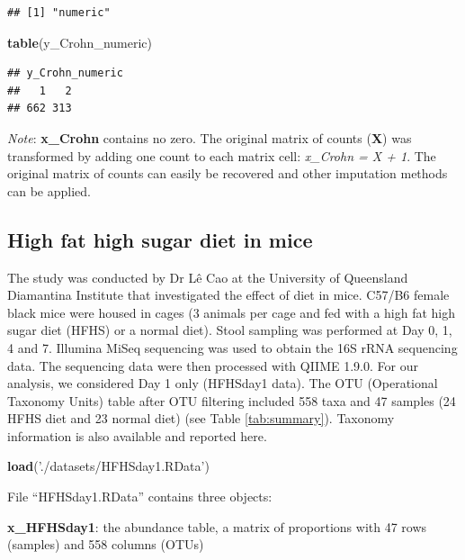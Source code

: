 \documentclass[openany]{book}
\newenvironment{Shaded}{\begin{snugshade}}{\end{snugshade}}
\newcommand{\KeywordTok}[1]{\textcolor[rgb]{0.13,0.29,0.53}{\textbf{#1}}}
\newcommand{\StringTok}[1]{\textcolor[rgb]{0.31,0.60,0.02}{#1}}
\newcommand{\NormalTok}[1]{#1}
\begin{document}
\begin{verbatim}
## [1] "numeric"
\end{verbatim}

\begin{Shaded}
\begin{Highlighting}[]
\KeywordTok{table}\NormalTok{(y_Crohn_numeric)}
\end{Highlighting}
\end{Shaded}

\begin{verbatim}
## y_Crohn_numeric
##   1   2 
## 662 313
\end{verbatim}

\emph{Note}: \textbf{x\_Crohn} contains no zero. The original matrix of
counts (\textbf{X}) was transformed by adding one count to each matrix
cell: \emph{x\_Crohn = X + 1}. The original matrix of counts can easily
be recovered and other imputation methods can be applied.

\subsection{High fat high sugar diet in
mice}\label{high-fat-high-sugar-diet-in-mice}

The study was conducted by Dr Lê Cao at the University of Queensland
Diamantina Institute that investigated the effect of diet in mice.
C57/B6 female black mice were housed in cages (3 animals per cage and
fed with a high fat high sugar diet (HFHS) or a normal diet). Stool
sampling was performed at Day 0, 1, 4 and 7. Illumina MiSeq sequencing
was used to obtain the 16S rRNA sequencing data. The sequencing data
were then processed with QIIME 1.9.0. For our analysis, we considered
Day 1 only (HFHSday1 data). The OTU (Operational Taxonomy Units) table
after OTU filtering included 558 taxa and 47 samples (24 HFHS diet and
23 normal diet) (see Table \ref{tab:summary}). Taxonomy information is
also available and reported here.

\begin{Shaded}
\begin{Highlighting}[]
\KeywordTok{load}\NormalTok{(}\StringTok{'./datasets/HFHSday1.RData'}\NormalTok{)}
\end{Highlighting}
\end{Shaded}

File ``HFHSday1.RData'' contains three objects:

\textbf{x\_HFHSday1}: the abundance table, a matrix of proportions with
47 rows (samples) and 558 columns (OTUs)
\end{document}
